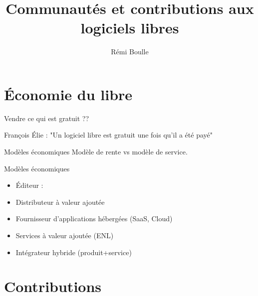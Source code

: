 \documentclass{beamer}
\title[]{Communautés et contributions aux logiciels libres}
\author{Rémi Boulle}
\date{}
\institute{}
\begin{document}


\begin{frame}
  \titlepage
\end{frame}


\section{Économie du libre}

\begin{frame}{Vendre ce qui est gratuit ??}
  \begin{block}{François Élie :}
 "Un logiciel libre est gratuit une fois qu'il a été payé"
\end{block}

\begin{alertblock}{Modèles économiques}
  Modèle de rente vs modèle de service.
\end{alertblock}
\end{frame}

\begin{frame}{Modèles économiques}
  \begin{itemize}
  \item Éditeur : 
  \item Distributeur à valeur ajoutée  
  \item Fournisseur d'applications hébergées (SaaS, Cloud)  
  \item Services à valeur ajoutée (ENL)  
  \item Intégrateur hybride (produit+service)  
  \end{itemize}
  
\end{frame}

\section{Contributions}
\end{document}

